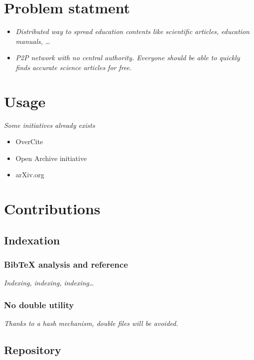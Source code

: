 \section{Problem statment}

\begin{itemize}
\item \textit{Distributed way to spread education contents like
scientific articles, education manuals, \ldots}
\item \textit{P2P network with no central authority. Everyone should be
able to quickly finds accurate science articles for free.}
\end{itemize}

\section{Usage}

\textit{Some initiatives already exists}

\begin{itemize}
\item OverCite
\item Open Archive initiative
\item arXiv.org
\end{itemize}

\section{Contributions}

\subsection{Indexation}

\subsubsection{Bib\TeX{} analysis and reference}

\textit{Indexing, indexing, indexing\ldots}

\subsubsection{No double utility}

\textit{Thanks to a hash mechanism, double files
will be avoided.}

\subsection{Repository}

